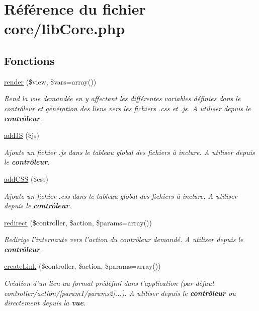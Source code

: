 \hypertarget{lib_core_8php}{\section{Référence du fichier core/lib\-Core.php}
\label{lib_core_8php}
}
\subsection*{Fonctions}
\begin{DoxyCompactItemize}
\item 
\hyperlink{lib_core_8php_a0d873ae3d276b3c9b164620ea3a83dc0}{render} (\$view, \$vars=array())
\begin{DoxyCompactList}\small\item\em Rend la vue demandée en y affectant les différentes variables définies dans le contrôleur et génération des liens vers les fichiers .css et .js. A utiliser depuis le {\bfseries contrôleur}. \end{DoxyCompactList}\item 
\hyperlink{lib_core_8php_a8f2e8ac7c5028583a64f546220dab2de}{add\-J\-S} (\$js)
\begin{DoxyCompactList}\small\item\em Ajoute un fichier .js dans le tableau global des fichiers à inclure. A utiliser depuis le {\bfseries contrôleur}. \end{DoxyCompactList}\item 
\hyperlink{lib_core_8php_adce775aa95de205dae7e259c163ba3bd}{add\-C\-S\-S} (\$css)
\begin{DoxyCompactList}\small\item\em Ajoute un fichier .css dans le tableau global des fichiers à inclure. A utiliser depuis le {\bfseries contrôleur}. \end{DoxyCompactList}\item 
\hyperlink{lib_core_8php_a1785c8b0d2b545f3a495f3eabdf3c095}{redirect} (\$controller, \$action, \$params=array())
\begin{DoxyCompactList}\small\item\em Redirige l'internaute vers l'action du contrôleur demandé. A utiliser depuis le {\bfseries contrôleur}. \end{DoxyCompactList}\item 
\hyperlink{lib_core_8php_a40b9a8f80be612334136684f32780bb3}{create\-Link} (\$controller, \$action, \$params=array())
\begin{DoxyCompactList}\small\item\em Création d'un lien au format prédéfini dans l'application (par défaut controller/action/\mbox{[}param1/params2\mbox{]}...). A utiliser depuis le {\bfseries contrôleur} ou directement depuis la {\bfseries vue}. \end{DoxyCompactList}\item 

\end{DoxyCompactItemize}
